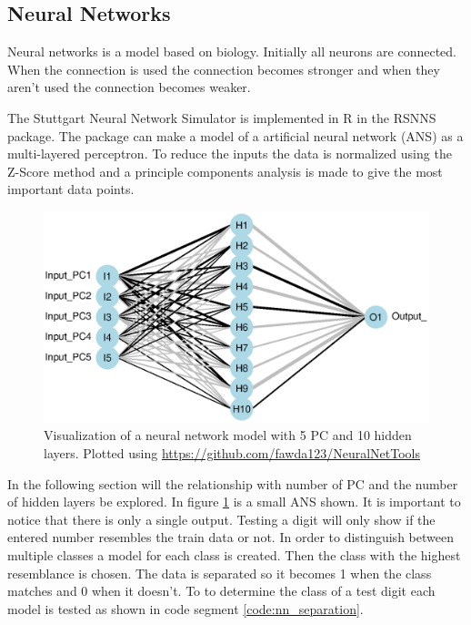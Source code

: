 \subsection{Neural Networks}

Neural networks is a model based on biology. 
Initially all neurons are connected. 
When the connection is used the connection becomes stronger and when they aren't used the connection becomes weaker.

The Stuttgart Neural Network Simulator is implemented in R in the RSNNS package.
The package can make a model of a artificial neural network (ANS) as a multi-layered perceptron.
To reduce the inputs the data is normalized using the Z-Score method and a principle components analysis is made to give the most important data points.

\begin{figure}[h]
    \includegraphics[width=\textwidth]{graphics/neural_network_visualized}
    \caption[Visualization of a neural network model.]{Visualization of a neural network model with 5 PC and 10 hidden layers. Plotted using \url{https://github.com/fawda123/NeuralNetTools}}
    \label{fig:neural_network_visualised}
\end{figure}

In the following section will the relationship with number of PC and the number of hidden layers be explored.
In figure \ref{fig:neural_network_visualised} is a small ANS shown.
It is important to notice that there is only a single output. 
Testing a digit will only show if the entered number resembles the train data or not.
In order to distinguish between multiple classes a model for each class is created.
Then the class with the highest resemblance is chosen.
The data is separated so it becomes 1 when the class matches and 0 when it doesn't.
To to determine the class of a test digit each model is tested as shown in code segment \ref{code:nn_separation}.

